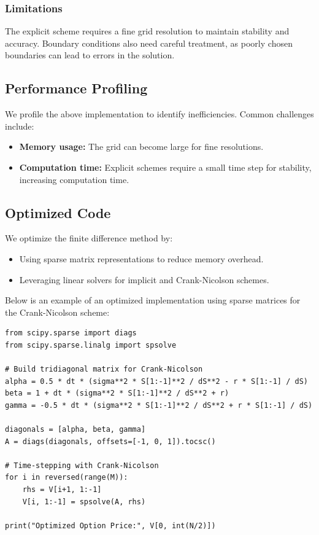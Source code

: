 \documentclass[12pt,a4paper]{report}
\begin{document}
\subsubsection{Limitations}
The explicit scheme requires a fine grid resolution to maintain stability and accuracy. Boundary conditions also need careful treatment, as poorly chosen boundaries can lead to errors in the solution.

\subsection{Performance Profiling}
We profile the above implementation to identify inefficiencies. Common challenges include:
\begin{itemize}
    \item \textbf{Memory usage:} The grid can become large for fine resolutions.
    \item \textbf{Computation time:} Explicit schemes require a small time step for stability, increasing computation time.
\end{itemize}

\subsection{Optimized Code}
We optimize the finite difference method by:
\begin{itemize}
    \item Using sparse matrix representations to reduce memory overhead.
    \item Leveraging linear solvers for implicit and Crank-Nicolson schemes.
\end{itemize}

Below is an example of an optimized implementation using sparse matrices for the Crank-Nicolson scheme:

\begin{tcolorbox}[colframe=green!50!black, colback=green!5, title=Crank-Nicolson with Sparse Matrices]
\begin{verbatim}
from scipy.sparse import diags
from scipy.sparse.linalg import spsolve

# Build tridiagonal matrix for Crank-Nicolson
alpha = 0.5 * dt * (sigma**2 * S[1:-1]**2 / dS**2 - r * S[1:-1] / dS)
beta = 1 + dt * (sigma**2 * S[1:-1]**2 / dS**2 + r)
gamma = -0.5 * dt * (sigma**2 * S[1:-1]**2 / dS**2 + r * S[1:-1] / dS)

diagonals = [alpha, beta, gamma]
A = diags(diagonals, offsets=[-1, 0, 1]).tocsc()

# Time-stepping with Crank-Nicolson
for i in reversed(range(M)):
    rhs = V[i+1, 1:-1]
    V[i, 1:-1] = spsolve(A, rhs)

print("Optimized Option Price:", V[0, int(N/2)])
\end{verbatim}
\end{tcolorbox}
\end{document}
